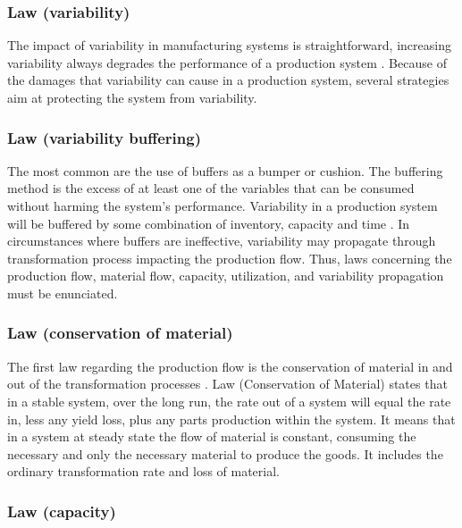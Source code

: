 \documentclass{article}
\begin{document}
\subsubsection{Law (variability)}
\label{sec:org0d9c77a}

The impact of variability in manufacturing systems is straightforward, increasing variability always degrades the performance of a production system \citep{Hopp2001}.
Because of the damages that variability can cause in a production system, several strategies aim at protecting the system from variability.

\subsubsection{Law (variability buffering)}
\label{sec:org56633c4}

The most common are the use of buffers as a bumper or cushion.
The buffering method is the excess of at least one of the variables that can be consumed without harming the system's performance.
Variability in a production system will be buffered by some combination of inventory, capacity and time \citep{Hopp2001}.
In circumstances where buffers are ineffective, variability may propagate through transformation process impacting the production flow.
Thus, laws concerning the production flow, material flow, capacity, utilization, and variability propagation must be enunciated.

\subsubsection{Law (conservation of material)}
\label{sec:org517586d}

The first law regarding the production flow is the conservation of material in and out of the transformation processes \citep{Hopp2001}.
Law (Conservation of Material) states that in a stable system, over the long run, the rate out of a system will equal the rate in, less any yield loss, plus any parts production within the system.
It means that in a system at steady state the flow of material is constant, consuming the necessary and only the necessary material to produce the goods.
It includes the ordinary transformation rate and loss of material.

\subsubsection{Law (capacity)}
\label{sec:org83c2905}
\end{document}
